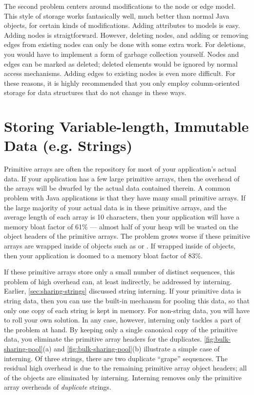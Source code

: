 The second problem centers around modifications to the node or edge model. This
style of storage works fantasically well, much better than normal Java objects,
for certain kinds of modifications. Adding attributes to models is easy.
Adding nodes is straigtforward. However, deleting nodes, and adding or
removing edges from existing nodes can only be done with some extra work. For
deletions, you would have to implement a form of garbage collection yourself.
Nodes and edges can be marked as deleted; deleted elements would be ignored by
normal access mechanisms. Adding edges to existing nodes is even more difficult.
For these reasons, it is highly recommended that you only employ column-oriented
storage for data structures that do not change in these ways.

\section{Storing Variable-length, Immutable Data (e.g. Strings)}
\label{sec:bulk-sharing-pool}

Primitive arrays are often the repository for most of your application's actual
data. If your application has a few large primitive arrays, then the overhead of
the arrays will be dwarfed by the actual data contained therein. A common problem
with Java applications is that they have many small primitive arrays.
 If the large majority of your actual data is in
these primitive arrays, and the average length of each array is 10 characters,
then your application will have a memory bloat factor of 61\%
--- almost half of your heap will be wasted on the object headers of the
primitive arrays. The problem grows worse if these primitive arrays are wrapped
inside of objects such as  or . If
wrapped inside of  objects, then your application is doomed to a
memory bloat factor of 83\%.

If these primitive arrays store only a small number of distinct sequences, this
problem of high overhead can, at least indirectly, be addressed by
interning. Earlier, \autoref{sec:sharing-strings} discussed
string interning. If your primitive data is string data, then you can use the
\jres built-in mechansm for pooling this data, so that only one copy of each
string is kept in memory. For non-string data, you will have to roll your own
solution. In any case, however, interning only tackles a part of the problem at
hand. By keeping only a single canonical copy of the primitive data, you
eliminate the primitive array headers for the duplicates.
\autoref{fig:bulk-sharing-pool}(a) and \autoref{fig:bulk-sharing-pool}(b)
illustrate a simple case of interning. Of three strings, there are two duplicate
``grape'' sequences. The residual high overhead is due to the remaining
primitive array object headers; all of the  objects are eliminated
by interning. Interning removes only the primitive array overheads of
\emph{duplicate} strings.


